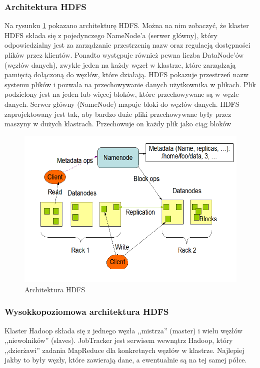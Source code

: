 \subsubsection{Architektura HDFS}
\label{ssub:hdfs_architecture}
Na rysunku \ref{fig:hdfs_architecture} pokazano architekturę HDFS. Można na nim zobaczyć, że klaster HDFS składa się z pojedynczego NameNode'a (serwer główny), który odpowiedzialny jest za zarządzanie przestrzenią nazw oraz regulacją dostępności plików przez klientów. Ponadto występuje również pewna liczba DataNode'ów (węzłów danych), zwykle jeden na każdy węzeł w klastrze, które zarządzają pamięcią dołączoną do węzłów, które działają. HDFS pokazuje przestrzeń nazw systemu plików i pozwala na przechowywanie danych użytkownika w plikach. Plik podzielony jest na jeden lub więcej bloków, które przechowywane są w węzle danych. Serwer główny (NameNode) mapuje bloki do węzłów danych.
HDFS zaprojektowany jest tak, aby bardzo duże pliki przechowywane były przez maszyny w dużych klastrach. Przechowuje on  każdy plik jako ciąg bloków

\begin{figure}[h]
    \centerline{\includegraphics[scale=0.5]{obrazki/HDFS_architecture.png}}
    \caption{Architektura HDFS}
    \label{fig:hdfs_architecture}
\end{figure}

\subsubsection{Wysokkopoziomowa architektura HDFS}
\label{ssub:hdfs_high_level_architecture}
Klaster Hadoop składa się z jednego węzła ,,mistrza'' (master) i wielu węzłów ,,niewolników'' (slaves). JobTracker jest serwisem wewnątrz Hadoop, który ,,dzierżawi'' zadania MapReduce dla konkretnych węzłów w klastrze. Najlepiej jakby to były węzły, które zawierają dane, a ewentualnie są na tej samej półce.

